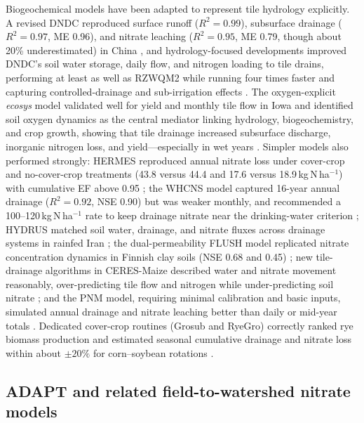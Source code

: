 Biogeochemical models have been adapted to represent tile hydrology explicitly. A revised DNDC reproduced surface runoff ($R^2 = 0.99$), subsurface drainage ($R^2 = 0.97$, ME 0.96), and nitrate leaching ($R^2 = 0.95$, ME 0.79, though about 20\% underestimated) in China \parencite{Deng2011}, and hydrology-focused developments improved DNDC's soil water storage, daily flow, and nitrogen loading to tile drains, performing at least as well as RZWQM2 while running four times faster and capturing controlled-drainage and sub-irrigation effects \parencite{Smith2020}. The oxygen-explicit \textit{ecosys} model validated well for yield and monthly tile flow in Iowa and identified soil oxygen dynamics as the central mediator linking hydrology, biogeochemistry, and crop growth, showing that tile drainage increased subsurface discharge, inorganic nitrogen loss, and yield---especially in wet years \parencite{Ma2025}. Simpler models also performed strongly: HERMES reproduced annual nitrate loss under cover-crop and no-cover-crop treatments (43.8 versus 44.4 and 17.6 versus 18.9\,kg\,N\,ha$^{-1}$) with cumulative EF above 0.95 \parencite{Malone2017}; the WHCNS model captured 16-year annual drainage ($R^2 = 0.92$, NSE 0.90) but was weaker monthly, and recommended a 100--120\,kg\,N\,ha$^{-1}$ rate to keep drainage nitrate near the drinking-water criterion \parencite{Liang2018}; HYDRUS matched soil water, drainage, and nitrate fluxes across drainage systems in rainfed Iran \parencite{Haghnazari2020}; the dual-permeability FLUSH model replicated nitrate concentration dynamics in Finnish clay soils (NSE 0.68 and 0.45) \parencite{Salo2015}; new tile-drainage algorithms in CERES-Maize described water and nitrate movement reasonably, over-predicting tile flow and nitrogen while under-predicting soil nitrate \parencite{Garrison1999}; and the PNM model, requiring minimal calibration and basic inputs, simulated annual drainage and nitrate leaching better than daily or mid-year totals \parencite{Marjerison2016}. Dedicated cover-crop routines (Grosub and RyeGro) correctly ranked rye biomass production and estimated seasonal cumulative drainage and nitrate loss within about $\pm20\%$ for corn--soybean rotations \parencite{Feyereisen2006,Feyereisen2007}.

\subsection{ADAPT and related field-to-watershed nitrate models}

